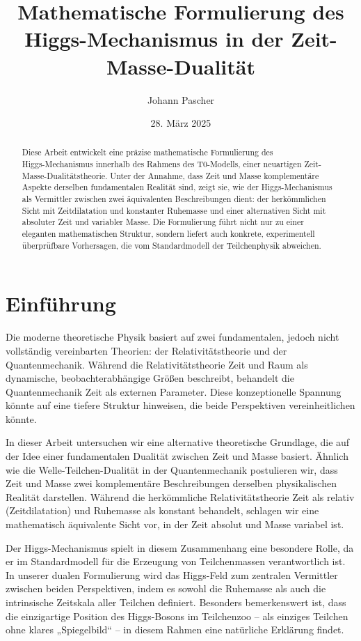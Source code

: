 \documentclass[a4paper,12pt]{article}
\title{Mathematische Formulierung des Higgs-Mechanismus in der Zeit-Masse-Dualität}
\author{Johann Pascher}
\date{28. März 2025}
\begin{document}
	
	\maketitle
	
	\begin{abstract}
		Diese Arbeit entwickelt eine präzise mathematische Formulierung des\\ Higgs-Mechanismus innerhalb des Rahmens des T0-Modells, einer neuartigen Zeit-Masse-Dualitätstheorie. Unter der Annahme, dass Zeit und Masse komplementäre Aspekte derselben fundamentalen Realität sind, zeigt sie, wie der Higgs-Mechanismus als Vermittler zwischen zwei äquivalenten Beschreibungen dient: der herkömmlichen Sicht mit Zeitdilatation und konstanter Ruhemasse und einer alternativen Sicht mit absoluter Zeit und variabler Masse. Die Formulierung führt nicht nur zu einer eleganten mathematischen Struktur, sondern liefert auch konkrete, experimentell überprüfbare Vorhersagen, die vom Standardmodell der Teilchenphysik abweichen.
	\end{abstract}
	
	\tableofcontents
	\newpage
	
	\section{Einführung}
	Die moderne theoretische Physik basiert auf zwei fundamentalen, jedoch nicht vollständig vereinbarten Theorien: der Relativitätstheorie und der Quantenmechanik. Während die Relativitätstheorie Zeit und Raum als dynamische, beobachterabhängige Größen beschreibt, behandelt die Quantenmechanik Zeit als externen Parameter. Diese konzeptionelle Spannung könnte auf eine tiefere Struktur hinweisen, die beide Perspektiven vereinheitlichen könnte.
	
	In dieser Arbeit untersuchen wir eine alternative theoretische Grundlage, die auf der Idee einer fundamentalen Dualität zwischen Zeit und Masse basiert. Ähnlich wie die Welle-Teilchen-Dualität in der Quantenmechanik postulieren wir, dass Zeit und Masse zwei komplementäre Beschreibungen derselben physikalischen Realität darstellen. Während die herkömmliche Relativitätstheorie Zeit als relativ (Zeitdilatation) und Ruhemasse als konstant behandelt, schlagen wir eine mathematisch äquivalente Sicht vor, in der Zeit absolut und Masse variabel ist.
	
	Der Higgs-Mechanismus spielt in diesem Zusammenhang eine besondere Rolle, da er im Standardmodell für die Erzeugung von Teilchenmassen verantwortlich ist. In unserer dualen Formulierung wird das Higgs-Feld zum zentralen Vermittler zwischen beiden Perspektiven, indem es sowohl die Ruhemasse als auch die intrinsische Zeitskala aller Teilchen definiert. Besonders bemerkenswert ist, dass die einzigartige Position des Higgs-Bosons im Teilchenzoo – als einziges Teilchen ohne klares „Spiegelbild“ – in diesem Rahmen eine natürliche Erklärung findet.
	
\end{document}
